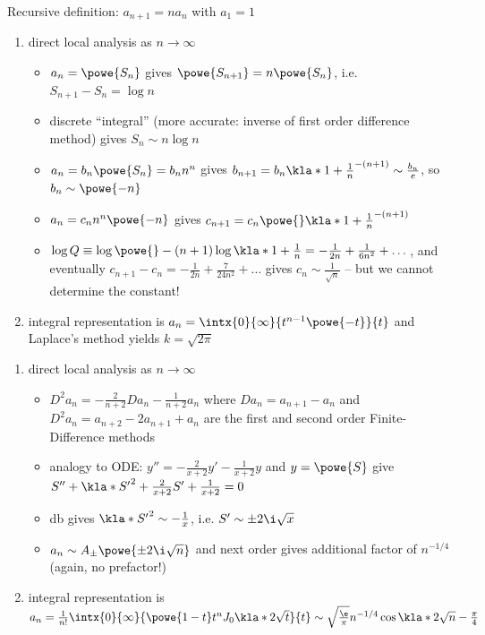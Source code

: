 \documentclass[english, parskip=full]{scrbook}
\newcommand{\example}[3]{\begin{tcolorbox}[colback=colorbackgroundexample,colframe=colorexample, breakable,enhanced,title={\textbf{#1}: #2.}]#3\end{tcolorbox}}
\begin{document}
\example{Gamma Function}{representation of $n!$ (more accurately $\Gamma(n)$, i.e. $(n+1)!$)}{Recursive definition: $a_{n+1} = na_n$ with $a_1=1$
\begin{enumerate}
\item direct local analysis as $n\rightarrow \infty$
\begin{itemize}
\item $a_n=\powe{S_n}$ gives $\powe{S_{n+1}} = n\powe{S_n}$, i.e. $S_{n+1}-S_n=\log n$
\item discrete ``integral'' (more accurate: inverse of first order difference method) gives $S_n\sim n\log n$
\item $a_n=b_n\powe{S_n} = b_n n^n$ gives $b_{n+1} = b_n \kla*{1 + \frac{1}{n}}^{-(n+1)} \sim \frac{b_n}{e}$, so $b_n \sim \powe{-n}$
\item $a_n = c_n n^n \powe{-n}$ gives $c_{n+1} = c_n \powe{} \kla*{1 + \frac{1}{n}}^{-(n+1)}$
\item $\log Q \equiv \log \powe{} - (n+1) \log\kla*{1+\frac{1}{n}} = -\frac{1}{2n} + \frac{1}{6n^2} + \dots$, and eventually $c_{n+1}-c_n = -\frac{1}{2n} + \frac{7}{24n^2} + \dots$ gives $c_n \sim \frac{1}{\sqrt{n}}$ -- but we cannot determine the constant!
\end{itemize}
\item integral representation is $a_n = \intx{0}{\infty}{t^{n-1} \powe{-t}}{t}$ and Laplace's method yields $k=\sqrt{2\pi}$
\end{enumerate}
}
\example{Another recursion}{$(n+1)a_{n+1} = 2na_n - na_{n-1}$ with $a_0=1$, $a_1=0$}{\begin{enumerate}
\item direct local analysis as $n\rightarrow\infty$
\begin{itemize}
\item $D^2a_n = -\frac{2}{n+2} Da_n - \frac{1}{n+2} a_n$ where $Da_n = a_{n+1} - a_n$ and $D^2a_n = a_{n+2} - 2a_{n+1} + a_n$ are the first and second order Finite-Difference methods
\item analogy to ODE: $y''=-\frac{2}{x+2}y' - \frac{1}{x+2}y$ and $y=\powe{S}$ give $S''+\kla*{S'}^2 + \frac{2}{x+2}S' + \frac{1}{x+2} = 0$
\item \gls{db} gives $\kla*{S'}^2 \sim -\frac{1}{x}$, i.e. $S'\sim\pm 2\i \sqrt{x}$
\item $a_n \sim A_\pm \powe{\pm 2\i\sqrt{n}}$ and next order gives additional factor of $n^{-1/4}$ (again, no prefactor!)
\end{itemize}
\item integral representation is $a_n = \frac{1}{n!} \intx{0}{\infty}{\powe{1-t} t^n J_0\kla*{2\sqrt{t}}}{t} \sim \sqrt{\frac{\e}{\pi}} n^{-1/4} \cos\kla*{2\sqrt{n} - \frac{\pi}{4}}$
\end{enumerate}
}
\end{document}
